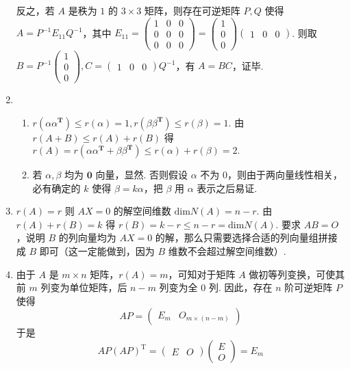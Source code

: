 \begin{enumerate}
    反之，若 $A$ 是秩为 $1$ 的 $3\times 3$ 矩阵，则存在可逆矩阵 $P,Q$ 使得 $A=P^{-1}E_{11}Q^{-1}$，其中 $E_{11}=\begin{pmatrix}1 & 0 & 0 \\ 0 & 0 & 0 \\ 0 & 0 & 0\end{pmatrix}=\begin{pmatrix}1 \\ 0 \\ 0\end{pmatrix}\begin{pmatrix}1 & 0 & 0\end{pmatrix}$.
    则取 $B=P^{-1}\begin{pmatrix}1 \\ 0 \\ 0\end{pmatrix},C=\begin{pmatrix}1 & 0 & 0\end{pmatrix}Q^{-1}$，有 $A=BC$，证毕.
    \item \begin{enumerate}
        \item $r(\alpha \alpha^{\mathbf{T}})\leq r(\alpha) = 1,r(\beta \beta^{\mathbf{T}})\leq r(\beta) = 1$. 由 $r(A+B) \leq r(A)+r(B)$ 得 $r(A)=r(\alpha \alpha^{\mathbf{T}}+\beta \beta^{\mathbf{T}}) \leq r(\alpha)+r(\beta)=2.$
        \item 若 $\alpha,\beta$ 均为 $\mathbf{0}$ 向量，显然. 否则假设 $\alpha$ 不为 $0$，则由于两向量线性相关，必有确定的 $k$ 使得 $\beta = k\alpha$，把 $\beta$ 用 $\alpha$ 表示之后易证.
    \end{enumerate}
    \item $r(A)=r$ 则 $AX=0$ 的解空间维数 $\mathrm{dim}N(A) = n-r$. 由 $r(A)+r(B)=k$ 得 $r(B)=k-r \leq n-r=\mathrm{dim}N(A)$. 要求 $AB=O$，说明 $B$ 的列向量均为 $AX=0$ 的解，那么只需要选择合适的列向量组拼接成 $B$ 即可（这一定能做到，因为 $B$ 维数不会超过解空间维数）.
    \item 由于 $A$ 是 $m\times n$ 矩阵，$r(A)=m$，可知对于矩阵 $A$ 做初等列变换，可使其前 $m$ 列变为单位矩阵，后 $n-m$ 列变为全 $0$ 列.
    因此，存在 $n$ 阶可逆矩阵 $P$ 使得
    \[AP=\begin{pmatrix}E_m & O_{m\times (n-m)}\end{pmatrix}\]
    于是\[AP(AP)^{\mathrm{T}} = \begin{pmatrix}E & O\end{pmatrix} \begin{pmatrix}E \\ O\end{pmatrix}=E_m\]

\end{enumerate}

